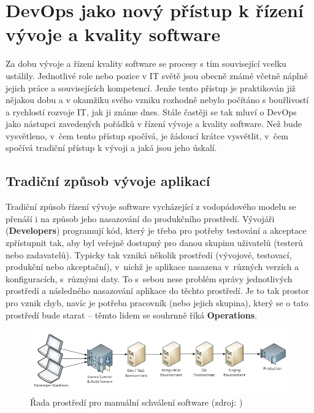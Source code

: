 \documentclass[FM,DP]{tulthesis}
\begin{document}
\chapter{DevOps jako nový přístup k řízení vývoje a kvality software}

Za dobu vývoje a řízení kvality software se procesy s tím související vcelku ustálily. Jednotlivé role
nebo pozice v IT světě jsou obecně známé včetně náplně jejich práce a souvisejících kompetencí. 
Jenže tento přístup je praktikován již nějakou dobu a v okamžiku svého vzniku rozhodně nebylo počítáno
s bouřlivostí a rychlostí rozvoje IT, jak ji známe dnes. Stále častěji se tak mluví o DevOps jako
nástupci zavedených pořádků v řízení vývoje a kvality software. Než bude vysvětleno, v~čem tento
přístup spočívá, je žádoucí krátce vysvětlit, v~čem spočívá tradiční přístup k vývoji a jaká jsou jeho
úskalí.

\section{Tradiční způsob vývoje aplikací}

Tradiční způsob řízení vývoje software vycházející z vodopádového modelu se přenáší i na způsob
jeho nasazování do produkčního prostředí. Vývojáři (\textbf{Developers}) programují kód, který je
třeba pro potřeby testování a akceptace zpřístupnit tak, aby byl veřejně dostupný pro danou skupinu 
uživatelů (testerů nebo zadavatelů). Typicky tak vzniká několik prostředí (vývojové, testovací, 
produkční nebo akceptační), v~nichž je aplikace nasazena v~různých verzích a konfiguracích, s~různými daty. 
To s~sebou nese problém správy jednotlivých prostředí a následného nasazování aplikace do těchto prostředí.
Je to tak prostor pro vznik chyb, navíc je potřeba pracovník (nebo jejich skupina), který se
o tato prostředí bude starat -- těmto lidem se souhrnně říká \textbf{Operations}.

\begin{figure}[h]
\center
\includegraphics[width=\textwidth]{deployment.png}
\caption{Řada prostředí pro manuální schválení software (zdroj: \cite{deployment})}
\label{deployment}
\end{figure}
\end{document}
